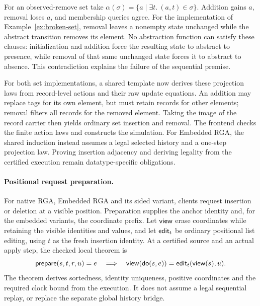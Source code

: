 For an observed-remove set take
$\alpha(\sigma)=\{a\mid\exists t.\ (a,t)\in\sigma\}$.
Addition gains $a$, removal loses $a$, and membership queries agree.
For the implementation of Example~\ref{ex:broken-set}, removal leaves a
nonempty state unchanged while the abstract transition removes its element.
No abstraction function can satisfy these clauses: initialization and addition
force the resulting state to abstract to presence, while removal of that same
unchanged state forces it to abstract to absence. This contradiction explains
the failure of the sequential premise.

For both set implementations, a shared template now derives these projection
laws from record-level actions and their raw update equations. An addition may
replace tags for its own element, but must retain records for other elements;
removal filters all records for the removed element. Taking the image of the
record carrier then yields ordinary set insertion and removal. The frontend
checks the finite action laws and constructs the simulation. For Embedded RGA,
the shared induction instead assumes a legal selected history and a one-step
projection law. Proving insertion adjacency and deriving legality from the
certified execution remain datatype-specific obligations.

\paragraph{Positional request preparation.}\label{par:client-preparation}
For native RGA, Embedded RGA and its sided variant, clients request insertion
or deletion at a visible position. Preparation supplies the anchor identity
and, for the embedded variants, the coordinate prefix. Let $\mathsf{view}$ erase coordinates while retaining the visible identities
and values, and let $\mathsf{edit}_t$ be ordinary positional list editing, using $t$
as the fresh insertion identity. At a certified source and an actual apply step,
the checked local theorem is
\[
 \mathsf{prepare}(s,t,r,u)=e
 \quad\Longrightarrow\quad
 \mathsf{view}(\mathsf{do}(s,e))=\mathsf{edit}_t(\mathsf{view}(s),u).
\]
The theorem derives sortedness, identity uniqueness, positive coordinates and
the required clock bound from the execution. It does not assume a legal
sequential replay, or replace the separate global history bridge.

